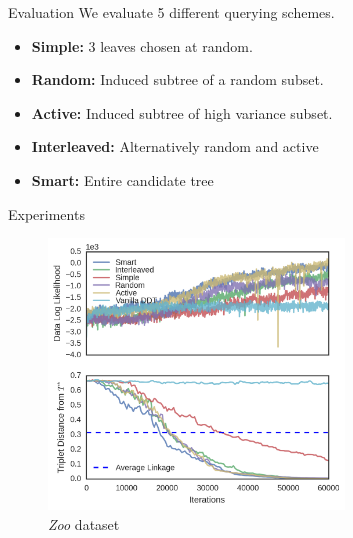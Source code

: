 \documentclass[10pt, compress]{beamer}
\begin{document}
\begin{frame}{Evaluation}
  We evaluate 5 different querying schemes.
  \begin{itemize}
    \item<2-> \textbf{Simple:} 3 leaves chosen at random.
    \item<3-> \textbf{Random:} Induced subtree of a random subset.
    \item<4-> \textbf{Active:} Induced subtree of high variance subset.
    \item<5-> \textbf{Interleaved:} Alternatively random and active
    \item<6-> \textbf{Smart:} Entire candidate tree
  \end{itemize}


\end{frame}

\begin{frame}{Experiments}
\begin{figure}
    \centering
    \includegraphics[frame, width=0.7\textwidth]{img/interactive}
    \caption{\emph{Zoo} dataset}
    \label{fig:ibhc}
  \end{figure}
\end{frame}
\end{document}
